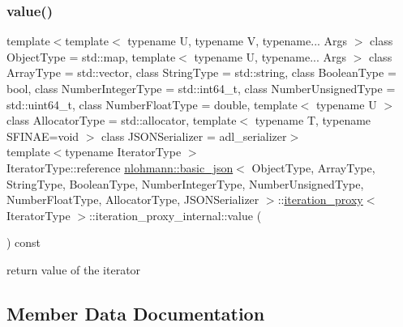 \subsubsection{\texorpdfstring{value()}{value()}}
{\footnotesize\ttfamily template$<$template$<$ typename U, typename V, typename... Args $>$ class Object\+Type = std\+::map, template$<$ typename U, typename... Args $>$ class Array\+Type = std\+::vector, class String\+Type  = std\+::string, class Boolean\+Type  = bool, class Number\+Integer\+Type  = std\+::int64\+\_\+t, class Number\+Unsigned\+Type  = std\+::uint64\+\_\+t, class Number\+Float\+Type  = double, template$<$ typename U $>$ class Allocator\+Type = std\+::allocator, template$<$ typename T, typename S\+F\+I\+N\+A\+E=void $>$ class J\+S\+O\+N\+Serializer = adl\+\_\+serializer$>$ \\
template$<$typename Iterator\+Type $>$ \\
Iterator\+Type\+::reference \hyperlink{classnlohmann_1_1basic__json}{nlohmann\+::basic\+\_\+json}$<$ Object\+Type, Array\+Type, String\+Type, Boolean\+Type, Number\+Integer\+Type, Number\+Unsigned\+Type, Number\+Float\+Type, Allocator\+Type, J\+S\+O\+N\+Serializer $>$\+::\hyperlink{classnlohmann_1_1basic__json_1_1iteration__proxy}{iteration\+\_\+proxy}$<$ Iterator\+Type $>$\+::iteration\+\_\+proxy\+\_\+internal\+::value (\begin{DoxyParamCaption}{ }\end{DoxyParamCaption}) const\hspace{0.3cm}{\ttfamily [inline]}}



return value of the iterator 



\subsection{Member Data Documentation}
\mbox{\label{classnlohmann_1_1basic__json_1_1iteration__proxy_1_1iteration__proxy__internal_ab551ab326378a035cedb9aa9e3c7bda4}} 
